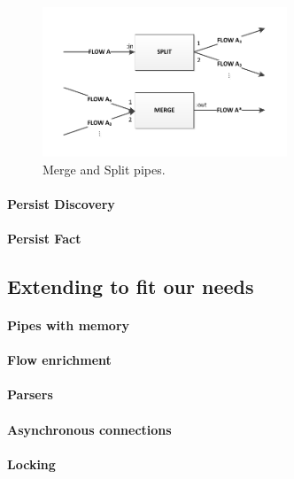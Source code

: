\begin{figure}[htbp]
	\centering
		\includegraphics[width=0.65\textwidth]{fig/mergeandsplit}
	\caption{Merge and Split pipes.}
	\label{fig:mergeandsplit}
\end{figure}

\paragraph{Persist Discovery}

\paragraph{Persist Fact}

\subsection{Extending to fit our needs}

\paragraph{Pipes with memory} 

\paragraph{Flow enrichment}

\paragraph{Parsers}

\paragraph{Asynchronous connections}

\paragraph{Locking}

